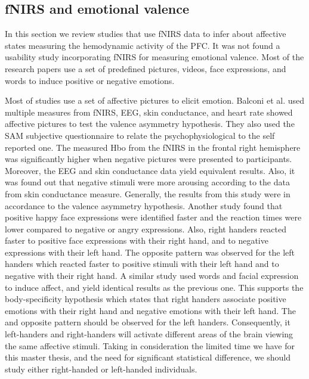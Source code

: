 \documentclass[a4paper]{report}
\begin{document}
					
		\subsection{fNIRS and emotional valence}
			In this section we review studies that use fNIRS data to infer about affective states measuring the hemodynamic activity of the PFC. It was not found a usability study incorporating fNIRS for measuring emotional valence. Most of the research papers use a set of predefined pictures, videos, face expressions, and words to induce positive or negative emotions.
			
			Most of studies use a set of affective pictures\cite{lang1997international} to elicit emotion. Balconi et al.\cite{balconi2015hemodynamic} used multiple measures from fNIRS, EEG, skin conductance, and heart rate showed affective pictures to test the valence asymmetry hypothesis. They also used the SAM subjective questionnaire to relate the psychophysiological to the self reported one. The measured Hbo from the fNIRS in the frontal right hemisphere was significantly higher when negative pictures were presented to participants. Moreover, the EEG and skin conductance data yield equivalent results. Also, it was found out that negative stimuli were more arousing according to the data from skin conductance measure. Generally, the results from this study were in accordance to the valence asymmetry hypothesis.	Another study found that positive happy face expressions were identified faster and the reaction times were lower compared to negative or angry expressions\cite{root2006left}. Also, right handers reacted faster to positive face expressions with their right hand, and to negative expressions with their left hand. The opposite pattern was observed for the left handers which reacted faster to positive stimuli with their left hand and to negative with their right hand. A similar study\cite{kong2013space} used words and facial expression to induce affect, and yield identical results as the previous one. This supports the body-specificity hypothesis\cite{casasanto2009embodiment} which states that right handers associate positive emotions with their right hand and negative emotions with their left hand. The and opposite pattern should be observed for the left handers. Consequently, it left-handers and right-handers will activate different areas of the brain viewing the same affective stimuli. Taking in consideration the limited time we have for this master thesis, and the need for significant statistical difference, we should study either right-handed or left-handed individuals.
			
\end{document}
